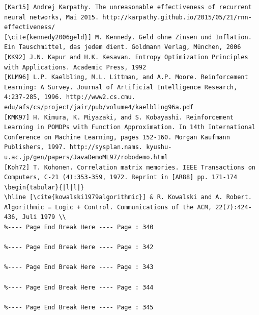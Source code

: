 \documentclass[10pt]{article}
\begin{document}
\begin{verbatim}
[Kar15] Andrej Karpathy. The unreasonable effectiveness of recurrent neural networks, Mai 2015. http://karpathy.github.io/2015/05/21/rnn-effectiveness/
[\cite{kennedy2006geld}] M. Kennedy. Geld ohne Zinsen und Inflation. Ein Tauschmittel, das jedem dient. Goldmann Verlag, München, 2006
[KK92] J.N. Kapur and H.K. Kesavan. Entropy Optimization Principles with Applications. Academic Press, 1992
[KLM96] L.P. Kaelbling, M.L. Littman, and A.P. Moore. Reinforcement Learning: A Survey. Journal of Artificial Intelligence Research, 4:237-285, 1996. http://www2.cs.cmu. edu/afs/cs/project/jair/pub/volume4/kaelbling96a.pdf
[KMK97] H. Kimura, K. Miyazaki, and S. Kobayashi. Reinforcement Learning in POMDPs with Function Approximation. In 14th International Conference on Machine Learning, pages 152-160. Morgan Kaufmann Publishers, 1997. http://sysplan.nams. kyushu-u.ac.jp/gen/papers/JavaDemoML97/robodemo.html
[Koh72] T. Kohonen. Correlation matrix memories. IEEE Transactions on Computers, C-21 (4):353-359, 1972. Reprint in [AR88] pp. 171-174
\begin{tabular}{|l|l|}
\hline [\cite{kowalski1979algorithmic}] & R. Kowalski and A. Robert. Algorithmic = Logic + Control. Communications of the ACM, 22(7):424-436, Juli 1979 \\
%---- Page End Break Here ---- Page : 340

%---- Page End Break Here ---- Page : 342

%---- Page End Break Here ---- Page : 343

%---- Page End Break Here ---- Page : 344

%---- Page End Break Here ---- Page : 345


\end{verbatim}
\end{document}
